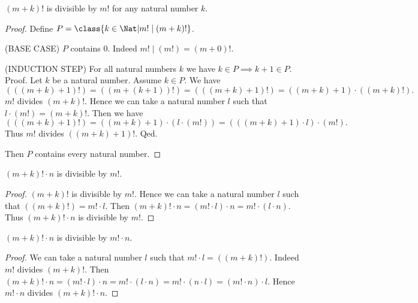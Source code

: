 \documentclass[../../arithmetic.tex]{subfiles}
\begin{document}
  \begin{forthel}
    \begin{proposition}\label{Arithmetic_03_06_805525}
      $(m + k)!$ is divisible by $m!$ for any natural number $k$.
    \end{proposition}
    \begin{proof}
      Define $P = \class{k \in \Nat | m! \mid (m + k)!}$.

      (BASE CASE) $P$ contains $0$.
      Indeed $m! \mid (m!) = (m + 0)!$.

      (INDUCTION STEP) For all natural numbers $k$ we have $k \in P \implies k + 1 \in P$. \\
      Proof.
        Let $k$ be a natural number.
        Assume $k \in P$.
        We have
        \[  (((m + k) + 1)!)
            = ((m + (k + 1))!)
            = (((m + k) + 1)!)
            = ((m + k) + 1) \cdot ((m + k)!). \]
        $m!$ divides $(m + k)!$.
        Hence we can take a natural number $l$ such that $l \cdot (m!) = (m + k)!$.
        Then we have
        \[  (((m + k) + 1)!)
            = ((m + k) + 1) \cdot (l \cdot (m!))
            = (((m + k) + 1) \cdot l) \cdot (m!). \]
        Thus $m!$ divides $((m + k) + 1)!$.
      Qed.

      Then $P$ contains every natural number.
    \end{proof}

    \begin{corollary}\label{Arithmetic_03_06_797409}
      $(m + k)! \cdot n$ is divisible by $m!$.
    \end{corollary}
    \begin{proof}
      $(m + k)!$ is divisible by $m!$.
      Hence we can take a natural number $l$ such that $((m + k)!) = m! \cdot l$.
      Then $(m + k)! \cdot n = (m! \cdot l) \cdot n = m! \cdot (l \cdot n)$.
      Thus $(m + k)! \cdot n$ is divisible by $m!$.
    \end{proof}

    \begin{corollary}\label{Arithmetic_03_06_319523}
      $(m + k)! \cdot n$ is divisible by $m! \cdot n$.
    \end{corollary}
    \begin{proof}
      We can take a natural number $l$ such that $m! \cdot l = ((m + k)!)$.
      Indeed $m!$ divides $(m + k)!$.
      Then $(m + k)! \cdot n = (m! \cdot l) \cdot n = m! \cdot (l \cdot n) = m! \cdot (n \cdot l) = (m! \cdot n) \cdot l$.
      Hence $m! \cdot n$ divides $(m + k)! \cdot n$.
    \end{proof}


\end{forthel}
\end{document}
